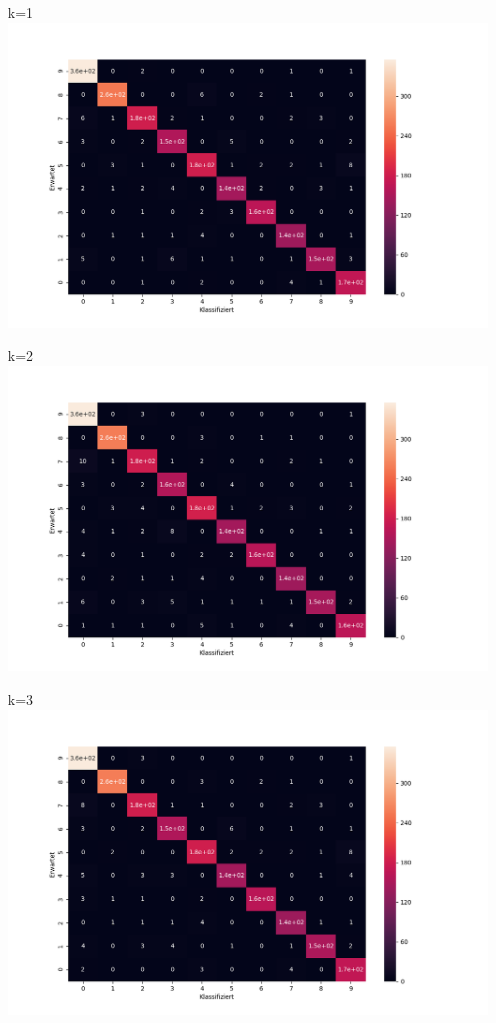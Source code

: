 \begin{enumerate}
    \item[k=1]
    \includegraphics[width=\textwidth]{./Plots/confusion_matrix_for_k_1.png}
    \item[k=2]
    \includegraphics[width=\textwidth]{./Plots/confusion_matrix_for_k_2.png}
    \item[k=3] 
    \includegraphics[width=\textwidth]{./Plots/confusion_matrix_for_k_3.png}
\end{enumerate}


